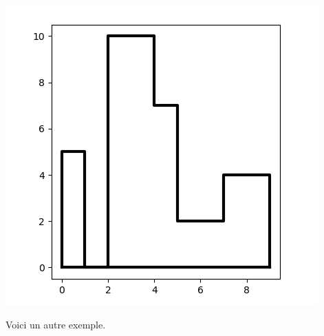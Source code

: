 \documentclass[11pt,class=report,crop=false]{standalone}
\begin{document}
\begin{activite}[Skyline]
\begin{center}
	\includegraphics[scale=\myscale,scale=0.3]{ecran-skyline-3}
\end{center}

Voici un autre exemple.


\end{activite}
\end{document}
